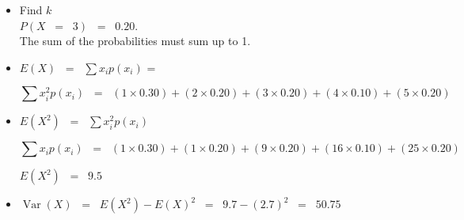 \documentclass[a4paper,12pt]{article}
\begin{document}
\begin{itemize}
\item Find $k$\\
$P(X\;\;=\;\;3) \;\;=\;\; 0.20$. \\The sum of the probabilities must sum up to 1.

\item $E(X) \;\;=\;\; \sum x_i p(x_i)$ \;\;=\;

\[\sum x^2_i p(x_i) \;\;=\;\; (1\times 0.30) + (2 \times 0.20) + (3 \times 0.20) + (4 \times 0.10) + (5 \times 0.20) \]



\item $E(X^2) \;\;=\;\; \sum x^2_i p(x_i)$

\[\sum x_i p(x_i) \;\;=\;\; (1\times 0.30) + (1 \times 0.20) + (9 \times 0.20) + (16 \times 0.10) + (25 \times 0.20) \]


$E(X^2) \;\;=\;\; 9.5$

\item $\operatorname{Var}(X) \;\;=\;\; E(X^2) - E(X)^2 \;\;=\;\; 9.7-(2.7)^2 \;\;=\;\; 50.75$
\end{itemize}
\end{document}
